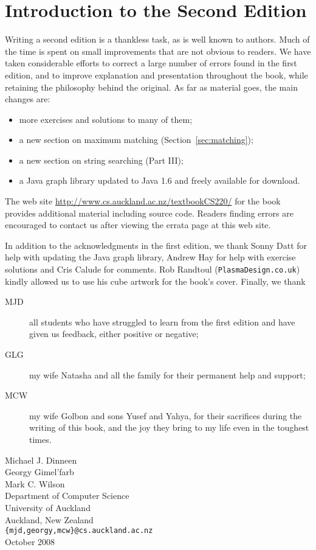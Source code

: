 \chapter*{Introduction to the Second Edition}

Writing a second edition is a thankless task, as is well known to authors. Much 
of the time is spent on small improvements that are not obvious to readers. 
We have taken considerable efforts to correct a large number of errors found 
in the first edition, and to improve explanation and presentation throughout the 
book, while retaining the philosophy behind the original. As far as material 
goes, the main changes are:
\begin{itemize}\setlength{\itemsep}{-1pt}
\item more exercises and solutions to many of them;
\item a new section on maximum matching (Section~\ref{sec:matching});
\item a new section on string searching (Part III); %
\item a Java graph library updated to Java 1.6 and freely available for download.
\end{itemize} 

The web site \url{http://www.cs.auckland.ac.nz/textbookCS220/} for the book
provides additional material including source code. Readers finding errors are
encouraged to contact us after viewing the errata page at this web site.

In addition to the acknowledgments in the first edition, we thank
Sonny Datt for help with updating the Java graph library,
Andrew Hay for help with exercise solutions and Cris Calude for comments.
Rob Randtoul (\texttt{PlasmaDesign.co.uk}) kindly allowed 
us to use his cube artwork for the book's cover.
Finally, we thank

\begin{description}
\item [MJD] all students who have struggled to learn from the first edition and 
have given us feedback, either positive or negative; 

\item [GLG] my wife Natasha and all the family for their permanent help 
and support;

\item[MCW] my wife Golbon and sons Yusef and Yahya, for their sacrifices 
during the writing of this book, and the joy they bring to my life even in 
the toughest times.
\end{description}

\bigskip

\begin{flushright}
Michael J. Dinneen\\
Georgy Gimel'farb\\
Mark C. Wilson\\[2ex]

Department of Computer Science\\ 
University of Auckland\\
Auckland, New Zealand\\[2ex]

\verb|{mjd,georgy,mcw}@cs.auckland.ac.nz|\\[2ex]
 October 2008
\end{flushright}




